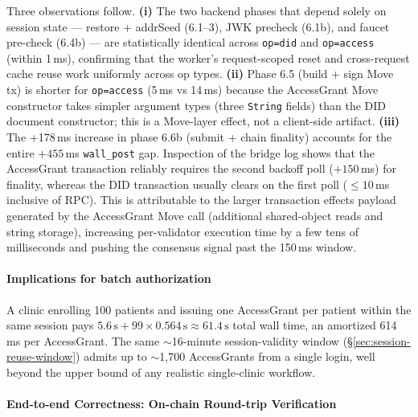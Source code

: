 Three observations follow.
\textbf{(i)} The two backend phases that depend solely on
session state — restore + addrSeed (6.1--3), JWK precheck (6.1b), and
faucet pre-check (6.4b) — are statistically identical across
\texttt{op=did} and \texttt{op=access} (within 1\,ms), confirming that
the worker's request-scoped reset and cross-request cache reuse work
uniformly across op types.
\textbf{(ii)} Phase 6.5 (build + sign Move tx) is shorter for
\texttt{op=access} (5\,ms vs 14\,ms) because the AccessGrant Move
constructor takes simpler argument types (three \texttt{String} fields)
than the DID document constructor; this is a Move-layer effect, not a
client-side artifact.
\textbf{(iii)} The +178\,ms increase in phase 6.6b
(submit + chain finality) accounts for the entire \(+455\)\,ms
\texttt{wall\_post} gap. Inspection of the bridge log shows that the
AccessGrant transaction reliably requires the second backoff poll
($+150$\,ms) for finality, whereas the DID transaction usually
clears on the first poll ($\le 10$\,ms inclusive of RPC). This is
attributable to the larger transaction effects payload generated by
the AccessGrant Move call (additional shared-object reads and string
storage), increasing per-validator execution time by a few tens of
milliseconds and pushing the consensus signal past the 150\,ms
window.

\paragraph{Implications for batch authorization}

A clinic enrolling 100 patients and issuing one AccessGrant per patient
within the same session pays
\(5.6\,\text{s} + 99 \times 0.564\,\text{s} \approx 61.4\,\text{s}\)
total wall time, an amortized 614\,ms per AccessGrant. The same
$\sim$16-minute session-validity window (\S\ref{sec:session-reuse-window})
admits up to $\sim$1{,}700 AccessGrants from a single login, well
beyond the upper bound of any realistic single-clinic workflow.

\paragraph{End-to-end Correctness: On-chain Round-trip Verification}
\label{sec:ehr-access-roundtrip}

